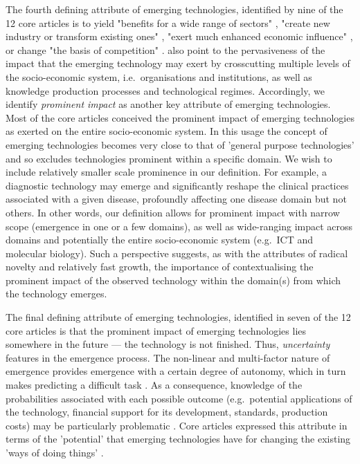 \documentclass[11pt]{article}
\begin{document}
The fourth defining attribute of emerging technologies, identified by nine of the 12 core articles is to yield "benefits for a wide range of sectors" \citep{Martin1995}, "create new industry or transform existing ones" \citep{Day2000}, "exert much enhanced economic influence" \citep{Porter2002}, or change "the basis of competition" \citep{Hung2006}. \cite{Corrocher2003} also point to the pervasiveness of the impact that the emerging technology may exert by crosscutting multiple levels of the socio-economic system, i.e.\ organisations and institutions, as well as knowledge production processes and technological regimes. Accordingly, we identify \textit{prominent impact} as another key attribute of emerging technologies. Most of the core articles conceived the prominent impact of emerging technologies as exerted on the entire socio-economic system. In this usage the concept of emerging technologies becomes very close to that of 'general purpose technologies' and so excludes technologies prominent within a specific domain. We wish to include relatively smaller scale prominence in our definition. For example, a diagnostic technology may emerge and significantly reshape the clinical practices associated with a given disease, profoundly affecting one disease domain but not others. In other words, our definition allows for prominent impact with narrow scope (emergence in one or a few domains), as well as wide-ranging impact across domains and potentially the entire socio-economic system (e.g.\ ICT and molecular biology). Such a perspective suggests, as with the attributes of radical novelty and relatively fast growth, the importance of contextualising the prominent impact of the observed technology within the domain(s) from which the technology emerges.

The final defining attribute of emerging technologies, identified in seven of the 12 core articles is that the prominent impact of emerging technologies lies somewhere in the future --- the technology is not finished. Thus, \textit{uncertainty} features in the emergence process. The non-linear and multi-factor nature of emergence provides emergence with a certain degree of autonomy, which in turn makes predicting a difficult task \citep{DeHaan2006,Mitchell2007}. As a consequence, knowledge of the probabilities associated with each possible outcome (e.g.\ potential applications of the technology, financial support for its development, standards, production costs) may be particularly problematic \citep{Stirling2007a}. Core articles expressed this attribute in terms of the 'potential' that emerging technologies have for changing the existing 'ways of doing things' \citep[e.g.][]{Boon2008,Hung2006,Stahl2011}. 
\end{document}
